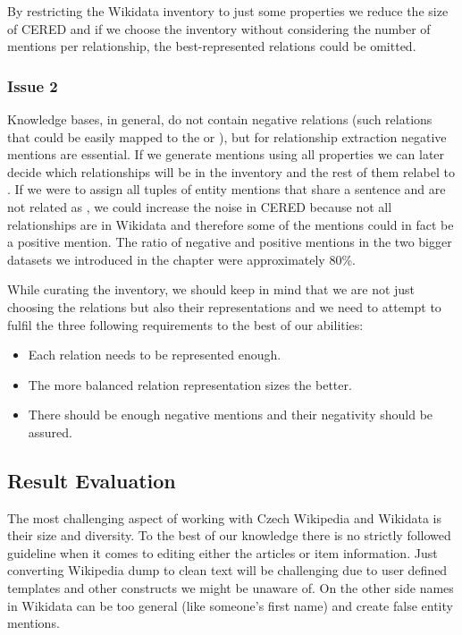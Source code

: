 By restricting the Wikidata inventory to just some properties we reduce the size of CERED and if we choose the inventory without considering the number of mentions per relationship, the best-represented relations could be omitted.

\subsubsection{Issue 2}Knowledge bases, in general, do not contain negative relations (such relations that could be easily mapped to the  or ), but for relationship extraction negative mentions are essential. If we generate mentions using all properties we can later decide which relationships will be in the inventory and the rest of them relabel to . If we were to assign all tuples of entity mentions that share a sentence and are not related as , we could increase the noise in CERED because not all relationships are in Wikidata and therefore some of the  mentions could in fact be a positive mention. The ratio of negative and positive mentions in the two bigger datasets we introduced in the  chapter were approximately 80\%.

While curating the inventory, we should keep in mind that we are not just choosing the relations but also their representations and we need to attempt to fulfil the three following requirements to the best of our abilities:
\begin{itemize}
\item Each relation needs to be represented enough.
\item The more balanced relation representation sizes the better.
\item There should be enough negative mentions and their negativity should be assured.

\end{itemize}

\subsection{Result Evaluation}
\label{sec:implementaceevaluace}
The most challenging aspect of working with Czech Wikipedia and Wikidata is their size and diversity. To the best of our knowledge there is no strictly followed guideline when it comes to editing either the articles or item information. Just converting Wikipedia dump to clean text will be challenging due to user defined templates and other constructs we might be unaware of. On the other side names in Wikidata can be too general (like someone's first name) and create false entity mentions. 

